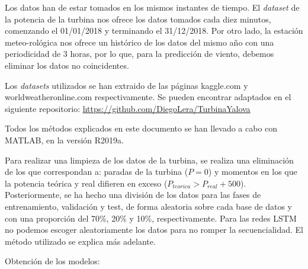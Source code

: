 \documentclass[journal]{IEEEtran}
\begin{document}
Los datos han de estar tomados en los mismos instantes de tiempo. El \emph{dataset} de la potencia de la turbina nos ofrece los datos tomados cada diez minutos, comenzando el 01/01/2018 y terminando el 31/12/2018.  Por otro lado, la estación meteo-rológica nos ofrece un histórico de los datos del mismo año con una periodicidad de 3 horas, por lo que, para la predicción de viento, debemos eliminar los datos no coincidentes.  


Los \emph{datasets} utilizados se han extraido de las páginas kaggle.com y worldweatheronline.com respectivamente. Se pueden encontrar adaptados en el siguiente repositorio: \url{https://github.com/DiegoLera/TurbinaYalova}

Todos los métodos explicados en este documento se han llevado a cabo con MATLAB, en la versión R2019a.

Para realizar una limpieza de los datos de la turbina, se realiza una eliminación de los que correspondan a: paradas de la turbina ($P=0$) y momentos en los que la potencia teórica y real difieren en exceso ($P_{teorica}>P_{real}+500$).
Posteriormente, se ha hecho una división de los datos para las fases de entrenamiento, validación y test, de forma aleatoria sobre cada base de datos y con una proporción del 70\%, 20\% y 10\%, respectivamente. Para las redes LSTM no podemos escoger aleatoriamente los datos para no romper la secuencialidad. El método utilizado se explica más adelante.

Obtención de los modelos:
\end{document}
